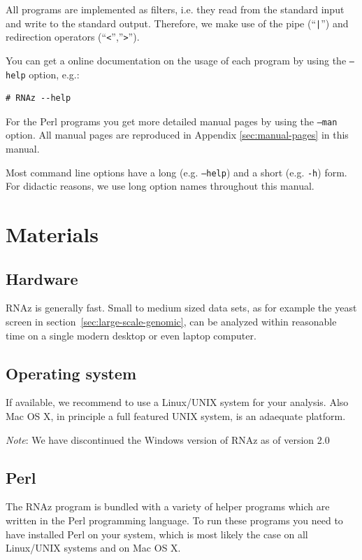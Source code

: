 \documentclass[11pt]{article}
\begin{document}
All programs are implemented as filters, i.e. they read from the standard
input and write to the standard output. Therefore, we make use of the pipe
(``\texttt{|}'') and redirection operators (``\texttt{<}'',''\texttt{>}'').

You can get a online documentation on the usage of each program by using
the \texttt{--help} option, e.g.:

\begin{verbatim}
# RNAz --help
\end{verbatim}

For the Perl programs you get more detailed manual pages by using the
\texttt{--man} option. All manual pages are reproduced in Appendix
\ref{sec:manual-pages} in this manual.

Most command line options have a long (e.g. \texttt{--help}) and a short
(e.g. \texttt{-h}) form. For didactic reasons, we use long option names
throughout this manual.

\section{Materials}

\subsection{Hardware}

RNAz is generally fast. Small to medium sized data sets, as for example the
yeast screen in section~\ref{sec:large-scale-genomic}, can be analyzed
within reasonable time on a single modern desktop or even laptop computer.

\subsection{Operating system}

If available, we recommend to use a Linux/UNIX system for your analysis.
Also Mac OS X, in principle a full featured UNIX system, is an adaequate
platform.

\emph{Note}: We have discontinued the Windows version of RNAz as of version 2.0


\subsection{Perl}
\label{sec:perl}

The RNAz program is bundled with a variety of helper programs
which are written in the Perl programming language. To run these programs
you need to have installed Perl on your system, which is most likely the
case on all Linux/UNIX systems and on Mac OS X.
 
\end{document}
